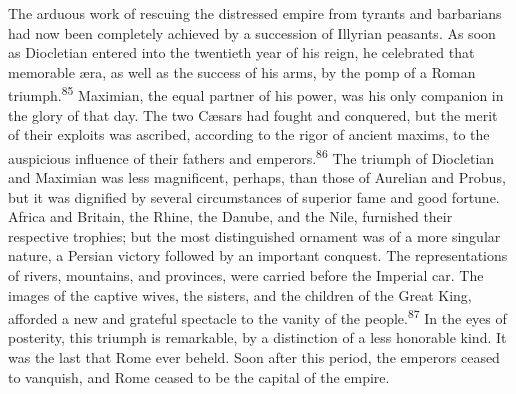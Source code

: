 The arduous work of rescuing the distressed empire from tyrants
and barbarians had now been completely achieved by a succession
of Illyrian peasants. As soon as Diocletian entered into the
twentieth year of his reign, he celebrated that memorable æra, as
well as the success of his arms, by the pomp of a Roman triumph.\textsuperscript{85}
Maximian, the equal partner of his power, was his only
companion in the glory of that day. The two Cæsars had fought and
conquered, but the merit of their exploits was ascribed,
according to the rigor of ancient maxims, to the auspicious
influence of their fathers and emperors.\textsuperscript{86} The triumph of
Diocletian and Maximian was less magnificent, perhaps, than those
of Aurelian and Probus, but it was dignified by several
circumstances of superior fame and good fortune. Africa and
Britain, the Rhine, the Danube, and the Nile, furnished their
respective trophies; but the most distinguished ornament was of a
more singular nature, a Persian victory followed by an important
conquest. The representations of rivers, mountains, and
provinces, were carried before the Imperial car. The images of
the captive wives, the sisters, and the children of the Great
King, afforded a new and grateful spectacle to the vanity of the
people.\textsuperscript{87} In the eyes of posterity, this triumph is remarkable,
by a distinction of a less honorable kind. It was the last that
Rome ever beheld. Soon after this period, the emperors ceased to
vanquish, and Rome ceased to be the capital of the empire.




